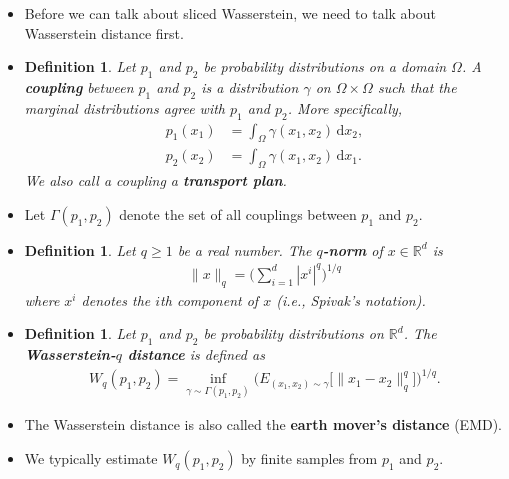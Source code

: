 \documentclass[10pt]{article}
\newtheorem{definition}[lemma]{Definition}
\newcommand{\dee}{\mathrm{d}}
\newcommand{\Real}{\mathbb{R}}
\begin{document}
\begin{itemize}
    \item Before we can talk about sliced Wasserstein, we need to talk about Wasserstein distance first.

    \item \begin{definition}
        Let $p_1$ and $p_2$ be probability distributions on a domain $\Omega$. A {\bf coupling} between $p_1$ and $p_2$ is a distribution $\gamma$ on $\Omega \times \Omega$ such that the marginal distributions agree with $p_1$ and $p_2$. More specifically,
        \begin{align*}
            p_1(x_1) &=  \int_{\Omega} \gamma(x_1, x_2)\, \dee x_2, \\
            p_2(x_2) &=  \int_{\Omega} \gamma(x_1, x_2)\, \dee x_1.
        \end{align*}
        We also call a coupling a {\bf transport plan}.        
    \end{definition}

    \item Let $\Gamma(p_1, p_2)$ denote the set of all couplings between $p_1$ and $p_2$.
    
    \item \begin{definition}
        Let $q \geq 1$ be a real number. The {\bf $q$-norm} of $x \in \Real^d$ is
        \begin{align*}
            \| x \|_q = \bigg( \sum_{i=1}^d |x^i|^q \bigg)^{1/q}
        \end{align*}
        where $x^i$ denotes the $i$th component of $x$ (i.e., Spivak's notation).
    \end{definition}
    
    \item \begin{definition}
        Let $p_1$ and $p_2$ be probability distributions on $\Real^d$. The {\bf Wasserstein-$q$ distance} is defined as
        \begin{align*}
            W_q(p_1, p_2) = \inf_{\gamma \sim \Gamma(p_1, p_2)} \bigg( E_{(x_1, x_2) \sim \gamma} \Big[ \big\| x_1 - x_2 \big\|^q_q \Big] \bigg)^{1/q}.
        \end{align*}
    \end{definition}

    \item The Wasserstein distance is also called the {\bf earth mover's distance} (EMD).

    \item We typically estimate $W_q(p_1,p_2)$ by finite samples from $p_1$ and $p_2$.
    

\end{itemize}
\end{document}
